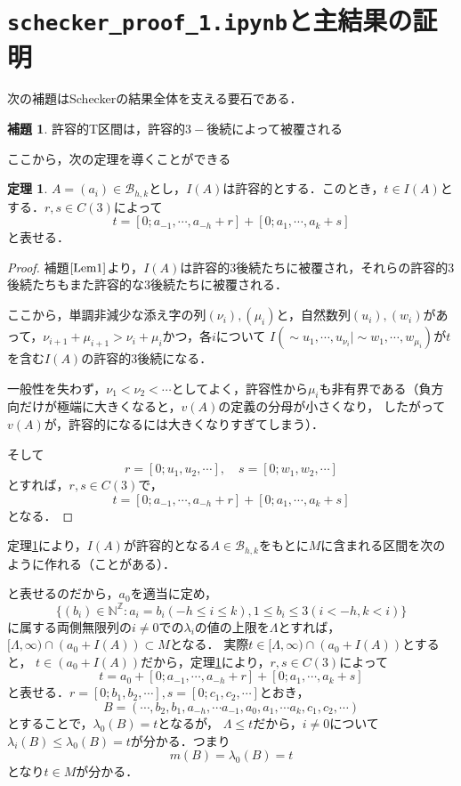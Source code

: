\documentclass[10pt,a4paper]{ujarticle}
\theoremstyle{definition}
\newtheorem{theorem}{定理}
\newtheorem{lemma}{補題}
\begin{document}
\section{\texttt{schecker\_proof\_1.ipynb}と主結果の証明}
次の補題はScheckerの結果全体を支える要石である．
\begin{lemma}
  \label{Lem1}
  許容的T区間は，許容的$3-$後続によって被覆される
\end{lemma}
ここから，次の定理を導くことができる
\begin{theorem}
  \label{Satz1}
  $A = (a_i)\in \mathcal{B}_{h,k}$とし，$I(A)$は許容的とする．このとき，$t\in I(A)$とする．$r, s\in C(3)$によって
  \[
  t = [0; a_{-1},\cdots, a_{-h} + r] + [0; a_{1},\cdots, a_{k} + s]
  \]
  と表せる．
\end{theorem}
\begin{proof}
  補題$\ref{Lem1}$より，$I(A)$は許容的$3$後続たちに被覆され，それらの許容的$3$後続たちもまた許容的な$3$後続たちに被覆される．

  ここから，単調非減少な添え字の列$(\nu_i), (\mu_i)$と，自然数列$(u_i), (w_i)$があって，$\nu_{i + 1} + \mu_{i + 1} > \nu_i + \mu_i$かつ，各$i$について
  $I(\sim u_1,\cdots, u_{\nu_i} | \sim w_1,\cdots, w_{\mu_i})$が$t$を含む$I(A)$の許容的$3$後続になる．

  一般性を失わず，$\nu_1 < \nu_2 < \cdots $としてよく，許容性から$\mu_i$も非有界である（負方向だけが極端に大きくなると，$v(A)$の定義の分母が小さくなり，
  したがって$v(A)$が，許容的になるには大きくなりすぎてしまう）．

  そして
  \[
  r = [0; u_1, u_2,\cdots], \quad s = [0; w_1,w_2,\cdots]
  \]
  とすれば，$r, s \in C(3)$で，
  \[
  t = [0; a_{-1},\cdots, a_{-h} + r] + [0; a_1,\cdots,a_k + s]
  \]
  となる．
\end{proof}

定理\ref{Satz1}により，$I(A)$が許容的となる$A\in \mathcal{B}_{h,k}$をもとに$M$に含まれる区間を次のように作れる（ことがある）．

と表せるのだから，$a_0$を適当に定め，
\[
\{(b_i) \in \mathbb{N}^\mathbb{Z} : a_i = b_i (-h \le i \le k ), 1\le b_i\le 3 (i < -h, k< i )\}
\]に属する両側無限列の$i\neq 0$での$\lambda_i$の値の上限を$\Lambda$とすれば，$[\Lambda,\infty) \cap (a_0 + I(A))\subset M$となる．
実際$t\in [\Lambda,\infty) \cap (a_0 + I(A))$とすると，
$t\in (a_0 + I(A))$だから，定理\ref{Satz1}により，$r, s\in C(3)$によって
\[
t = a_0 + [0; a_{-1},\cdots, a_{-h} + r] + [0; a_{1},\cdots, a_{k} + s]
\]
と表せる．$r = [0; b_1, b_2, \cdots], s = [0; c_1, c_2, \cdots]$とおき，
\[
B = (\cdots, b_2, b_1, a_{-h}, \cdots a_{-1}, a_0, a_1, \cdots a_k, c_1, c_2, \cdots)
\]とすることで，$\lambda_0(B) = t$となるが，
$\Lambda \le t$だから，$i\neq 0$について$\lambda_i(B) \le \lambda_0(B) = t$が分かる．つまり
\[
m(B) = \lambda_0(B) = t
\] 
となり$t\in M$が分かる．
\end{document}
